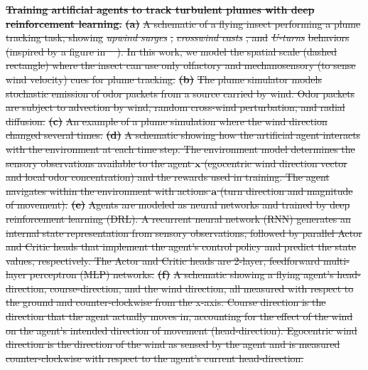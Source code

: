\documentclass[5p,twocolumn,authoryear]{elsarticle}
\providecommand{\DIFdeltex}[1]{{\protect\color{red}\sout{#1}}}                      %
\providecommand{\DIFdelbegin}{} %
\providecommand{\DIFdelFL}[1]{\DIFdel{#1}} %
\providecommand{\DIFdel}[1]{\texorpdfstring{\DIFdeltex{#1}}{}} %
\newcommand{\DIFscaledelfig}{0.5}
\newlength{\DIFdelgraphicswidth} %
\newlength{\DIFdelgraphicsheight} %
\newcommand{\DIFdelincludegraphics}[2][]{%
\sbox{\DIFdelgraphicsbox}{\DIFOincludegraphics[#1]{#2}}%
\settoboxwidth{\DIFdelgraphicswidth}{\DIFdelgraphicsbox} %
\settoboxtotalheight{\DIFdelgraphicsheight}{\DIFdelgraphicsbox} %
\scalebox{\DIFscaledelfig}{%
\parbox[b]{\DIFdelgraphicswidth}{\usebox{\DIFdelgraphicsbox}\\[-\baselineskip] \rule{\DIFdelgraphicswidth}{0em}}\llap{\resizebox{\DIFdelgraphicswidth}{\DIFdelgraphicsheight}{%
\setlength{\unitlength}{\DIFdelgraphicswidth}%
\begin{picture}(1,1)%
\thicklines\linethickness{2pt} %
{\color[rgb]{1,0,0}\put(0,0){\framebox(1,1){}}}%
{\color[rgb]{1,0,0}\put(0,0){\line( 1,1){1}}}%
{\color[rgb]{1,0,0}\put(0,1){\line(1,-1){1}}}%
\end{picture}%
}\hspace*{3pt}}} %
} %
\DeclareRobustCommand{\DIFdelbegin}{\DIFOdelbegin \let\includegraphics\DIFdelincludegraphics} %
\begin{document}
\DIFdelbegin %
{%
\textbf{\DIFdelFL{Training artificial agents to track turbulent plumes with deep reinforcement learning.}}
\textbf{\DIFdelFL{(a)}} 
\DIFdelFL{A schematic of a flying insect performing a plume tracking task, showing }\textit{\DIFdelFL{upwind surges}}%
\DIFdelFL{, }\textit{\DIFdelFL{crosswind casts}}%
\DIFdelFL{, and }\textit{\DIFdelFL{U-turns}} %
\DIFdelFL{behaviors (inspired by a figure in \mbox{%
\cite{baker2018algorithms}}\hspace{0pt}%
).
    In this work, we model the spatial scale (dashed rectangle) where the insect can use only olfactory and mechanosensory (to sense wind velocity) cues for plume tracking.
    }\textbf{\DIFdelFL{(b)}} 
\DIFdelFL{The plume simulator models stochastic emission of odor packets from a source carried by wind. 
    Odor packets are subject to advection by wind, random cross-wind perturbation, and radial diffusion.
    }\textbf{\DIFdelFL{(c)}}
\DIFdelFL{An example of a plume simulation where the wind direction changed several times.
    }\textbf{\DIFdelFL{(d)}} 
\DIFdelFL{A schematic showing how the artificial agent interacts with the environment at each time step. 
    The environment model determines the sensory observations available to the agent $\mathbf{x}$ (egocentric wind direction vector and local odor concentration) and the rewards used in training.
    The agent navigates within the environment with actions $\mathbf{a}$ (turn direction and magnitude of movement).
    }\textbf{\DIFdelFL{(e)}} %
\DIFdelFL{Agents are modeled as neural networks and trained by deep reinforcement learning (DRL). 
    A recurrent neural network (RNN) generates an internal state representation from sensory observations, followed by parallel Actor and Critic heads that implement the agent's control policy and predict the state values, respectively.
    The Actor and Critic heads are 2-layer, feedforward multi-layer perceptron (MLP) networks.
    }\textbf{\DIFdelFL{(f)}} 
\DIFdelFL{A schematic showing a flying agent's head-direction, course-direction, and the wind direction, all measured with respect to the ground and counter-clockwise from the x-axis.
    Course direction is the direction that the agent actually moves in, accounting for the effect of the wind on the agent's intended direction of movement (head-direction).
    Egocentric wind direction is the direction of the wind as sensed by the agent and is measured counter-clockwise with respect to the agent's current head-direction. 
    }}
\end{document}
